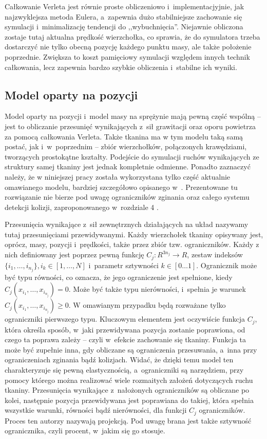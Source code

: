 			Całkowanie Verleta jest równie proste obliczeniowo i~implementacjyjnie, jak najzwyklejsza metoda Eulera, a~zapewnia dużo stabilniejsze zachowanie się symulacji i~minimalizację tendencji do ,,wybuchnięcia''. Niejawnie obliczona zostaje tutaj aktualna prędkość wierzchołka, co sprawia, że do symulatora trzeba dostarczyć nie tylko obecną pozycję każdego punktu masy, ale także położenie poprzednie. Zwiększa to koszt pamięciowy symulacji względem innych technik całkowania, lecz zapewnia bardzo szybkie obliczenia i~stabilne ich wyniki.
		
		\subsection{Model oparty na pozycji}
		\label{t:teoria:analiza:poz}
		
			Model oparty na pozycji i~model masy na sprężynie mają pewną część wspólną -- jest to obliczanie przesunięć wynikających z~sił grawitacji oraz oporu powietrza za pomocą całkowania Verleta. Także tkanina ma w tym modelu taką samą postać, jak i~w~poprzednim -- zbiór wierzchołków, połączonych krawędziami, tworzących prostokątne kształty. Podejście do symulacji ruchów wynikających ze struktury samej tkaniny jest jednak kompletnie odmienne. Ponadto zaznaczyć należy, że w niniejszej pracy została wykorzystana tylko część aktualnie omawianego modelu, bardziej szczegółowo opisanego w~\cite{posbased}. Prezentowane tu rozwiązanie nie bierze pod uwagę ograniczników zginania oraz całego systemu detekcji kolizji, zaproponowanego w~rozdziale 4 \cite{posbased}.
			
			Przesunięcia wynikające z~sił zewnętrznych działających na układ nazywamy tutaj przesunięciami przewidywanymi. Każdy wierzchołek tkaniny opisywany jest, oprócz, masy, pozycji i~prędkości, także przez zbiór tzw. ograniczników. Każdy z nich definiowany jest poprzez pewną funkcję \(C_{j} : R^{3n_{j}} \rightarrow R\), zestaw indeksów \(\{ i_{1}, \dots, i_{n_{j}}  \}, i_{k} \in [1, \dots, N] \) i~parametr sztywności \(k \in [0\dots1] \). Ogranicznik może być typu równości, co oznacza, że jego ograniczenie jest spełnione, kiedy \( C_{j}(x_{i_{1}}, \dots, x_{i_{n_{j}}} ) = 0 \). Może być także typu nierówności, i~spełnia je warunek \( C_{j}(x_{i_{1}}, \dots, x_{i_{n_{j}}} ) \geq 0 \). W omawianym przypadku będą rozważane tylko ograniczniki pierwszego typu. Kluczowym elementem jest oczywiście funkcja \(C_{j}\), która określa sposób, w~jaki przewidywana pozycja zostanie poprawiona, od czego ta poprawa zależy -- czyli w~efekcie zachowanie się tkaniny. Funkcja ta może być zupełnie inna, gdy obliczane są ograniczenia przesuwania, a~inna przy ograniczeniach zginania bądź kolizjach. Widać, że dzięki temu model ten charakteryzuje się pewną elastycznością, a~ograniczniki są narzędziem, przy pomocy którego można realizować wiele rozmaitych założeń dotyczących ruchu tkaniny. Przesunięcia wynikające z~nałożonych ograniczników są obliczane po kolei, następnie pozycja przewidywana jest poprawiana do takiej, która spełnia wszystkie warunki, równości bądź nierówności, dla funkcji \(C_{j}\) ograniczników. Proces ten autorzy \cite{posbased} nazywają projekcją. Pod uwagę brana jest także sztywność ogranicznika, czyli procent, w~jakim się go stosuje.
			
